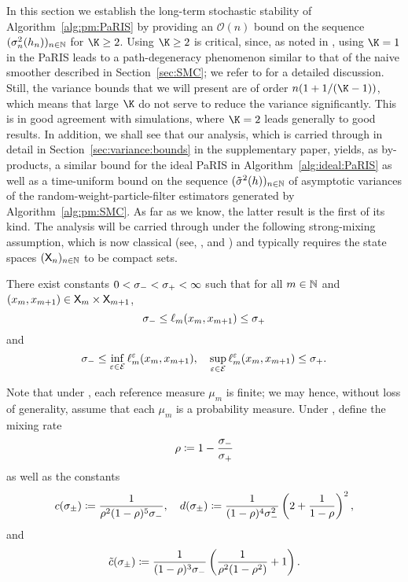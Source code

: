 In this section we establish the long-term stochastic stability of Algorithm~\ref{alg:pm:PaRIS} by providing an $\mathcal{O}(n)$ bound on the sequence $(\sigma^2_n (h_n))_{n \in \mathbb{N}}$ for $\K \geq 2$. Using $\K \geq 2$ is critical, since, as noted in \cite{olsson:westerborn:2014b}, using $\K = 1$ in the PaRIS leads to a path-degeneracy phenomenon similar to that of the naive smoother described in Section~\ref{sec:SMC}; we refer to \cite[Section~3.1]{olsson:westerborn:2014b} for a detailed discussion. Still, the variance bounds that we will present are of order $n(1 + 1/(\K - 1))$, which means that large $\K$ do not serve to reduce the variance significantly. This is in good agreement with simulations, where $\K = 2$ leads generally to good results. In addition, we shall see that our analysis, which is carried through in detail in Section~\ref{sec:variance:bounds} in the supplementary paper, yields, as by-products, a similar bound for the ideal PaRIS in Algorithm~\ref{alg:ideal:PaRIS} as well as a time-uniform bound on the sequence $(\tilde{\sigma}^2(h))_{n \in \mathbb{N}}$ of asymptotic variances of the random-weight-particle-filter estimators generated by Algorithm~\ref{alg:pm:SMC}. As far as we know, the latter result is the first of its kind. The analysis will be carried through under the following strong-mixing assumption, which is now classical (see, \eg, \cite[Chapter~4]{delmoral:2004} and \cite[Section~4.3]{Cappe:2005:IHM:1088883}) and typically requires the state spaces $(\mathsf{X}_n)_{n \in \mathbb{N}}$ to be compact sets. 
\begin{hypH}
\label{assum:strong:mixing}
There exist constants $0 < \sigma_- < \sigma_+ < \infty$ such that for all $m \in \mathbb{N}$ and $(x_m, x_{m + 1}) \in \mathsf{X}_m \times \mathsf{X}_{m + 1}$, 
$$
    \sigma_- \leq \ell_{m}(x_m, x_{m + 1}) \leq \sigma_+
$$ 
and 
$$
    \sigma_- \leq \inf_{\varepsilon \in \mathcal{E}} \ell^\varepsilon_{m}(x_m, x_{m + 1}), \quad \sup_{\varepsilon \in \mathcal{E}} \ell^\varepsilon_{m}(x_m, x_{m + 1}) \leq \sigma_+. 
$$ 
\end{hypH}
Note that under , each reference measure $\mu_m$ is finite; we may hence, without loss of generality, assume that each $\mu_m$ is a probability measure. Under , define the mixing rate 
\begin{equation} \label{eq:def:rho}
    \rho \eqdef 1 - \frac{\udlow}{\udup}
\end{equation}
as well as the constants 
$$
c(\sigma_\pm) \coloneqq \frac{1}{\rho^2 (1 - \rho)^5 \sigma_-}, \quad d(\sigma_\pm) \coloneqq \frac{1}{(1- \rho)^4 \sigma_-^2} \left( 2 + \frac{1}{1 - \rho} \right)^2, 
$$
and 
$$
\tilde{c}(\sigma_\pm) \coloneqq \frac{1}{(1 - \rho)^3 \sigma_-} \left( \frac{1}{\rho^2(1 - \rho^2)} + 1 \right). 
$$

